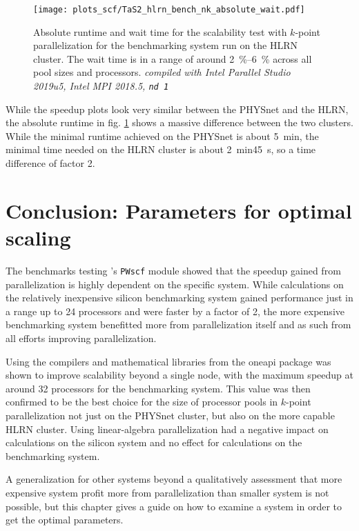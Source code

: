 \documentclass[main.tex]{subfiles}
\begin{document}
\begin{figure}
    \centering
    \texttt{[image: plots\_scf/TaS2\_hlrn\_bench\_nk\_absolute\_wait.pdf]}
\caption{Absolute runtime and wait time for the scalability test with \(k\)-point parallelization for the \TaS benchmarking system run on the HLRN cluster. The wait time is in a range of around \SIrange{2}{6}{\percent} across all pool sizes and processors. \emph{\QE compiled with Intel Parallel Studio 2019u5, Intel MPI 2018.5, \texttt{nd 1}}}
\label{fig:scaling_scf_hlrn_nk_TaS2_absolute_wait}
\end{figure}
While the speedup plots look very similar between the PHYSnet and the HLRN, the absolute runtime in fig. \ref{fig:scaling_scf_hlrn_nk_TaS2_absolute_wait} shows a massive difference between the two clusters.
While the minimal runtime achieved on the PHYSnet is about \SI{5}{\minute}, the minimal time needed on the HLRN cluster is about \SI{2}{\minute}\SI{45}{\second}, so a time difference of factor 2.

\section{Conclusion: Parameters for optimal scaling}

The benchmarks testing \QE 's \texttt{PWscf} module showed that the speedup gained from parallelization is highly dependent on the specific system.
While calculations on the relatively inexpensive silicon benchmarking system gained performance just in a range up to 24 processors and were faster by a factor of 2, the more expensive \TaS benchmarking system benefitted more from parallelization itself and as such from all efforts improving parallelization.

Using the compilers and mathematical libraries from the \gls{oneapi} package was shown to improve scalability beyond a single node, with the maximum speedup at around 32 processors for the \TaS benchmarking system.
This value was then confirmed to be the best choice for the size of processor pools in \(k\)-point parallelization not just on the PHYSnet cluster, but also on the more capable HLRN cluster.
Using linear-algebra parallelization had a negative impact on calculations on the silicon system and no effect for calculations on the \TaS benchmarking system.

A generalization for other systems beyond a qualitatively assessment that more expensive system profit more from parallelization than smaller system is not possible, but this chapter gives a guide on how to examine a system in order to get the optimal parameters.
\end{document}
